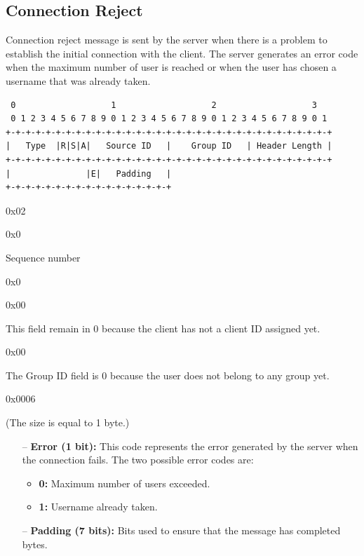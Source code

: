 \documentclass{article}
\begin{document}
\subsection{Connection Reject}
Connection reject message is sent by the server when there is a problem to establish the initial connection with the client. The server generates an error code when the maximum number of user is reached or when the user has chosen a username that was already taken.

\begin{verbatim}  
 0                   1                   2                   3  
 0 1 2 3 4 5 6 7 8 9 0 1 2 3 4 5 6 7 8 9 0 1 2 3 4 5 6 7 8 9 0 1
+-+-+-+-+-+-+-+-+-+-+-+-+-+-+-+-+-+-+-+-+-+-+-+-+-+-+-+-+-+-+-+-+
|   Type  |R|S|A|   Source ID   |    Group ID   | Header Length |
+-+-+-+-+-+-+-+-+-+-+-+-+-+-+-+-+-+-+-+-+-+-+-+-+-+-+-+-+-+-+-+-+
|               |E|   Padding   |
+-+-+-+-+-+-+-+-+-+-+-+-+-+-+-+-+
\end{verbatim}
\begin{description}[align=left]
    \item [Type:] 0x02
    
    \item [Reserved:] 0x0
    
    \item [Sequence:] Sequence number
    
    \item [Acknowledgement:] 0x0
    
    \item [Source ID:] 0x00
    \begin{flushleft}
        This field remain in 0 because the client has not a client ID assigned yet.
        
    \end{flushleft}
    
    \item [Group ID:] 0x00
    \begin{flushleft}
        The Group ID field is 0 because the user does not belong to any group yet.  
    \end{flushleft}
    
    \item [Header Length:] 0x0006

    \item[Options:] (The size is equal to 1 byte.)
    \begin{itemize}
        \item[--]\textbf{Error (1 bit):} This code represents the error generated by the server when the connection fails. The two possible error codes are:
        \begin{itemize}
            \item\textbf{0:} Maximum number of users exceeded.
            \item\textbf{1:} Username already taken.
        \end{itemize}
        \item[--]\textbf{Padding (7 bits):} Bits used to ensure that the message has completed bytes.
    \end{itemize}
\end{description}
\end{document}
